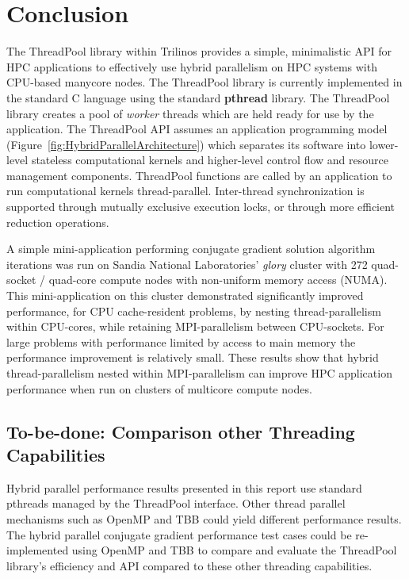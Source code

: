 \section{Conclusion}

The ThreadPool library within Trilinos provides a simple, minimalistic API for HPC applications to effectively use hybrid parallelism on HPC systems with CPU-based manycore nodes.
%
The ThreadPool library is currently implemented in the standard C language using the standard \textbf{pthread} library.
%
The ThreadPool library creates a pool of \emph{worker} threads which are held ready for use by the application.
%
The ThreadPool API assumes an application programming model
(Figure~\ref{fig:HybridParallelArchitecture}) which separates its software into lower-level stateless computational kernels and higher-level control flow and resource management components.
%
ThreadPool functions are called by an application to run computational kernels thread-parallel.
%
Inter-thread synchronization is supported through mutually exclusive execution locks, or through more efficient reduction operations.



A simple mini-application performing conjugate gradient solution algorithm iterations was run on Sandia National Laboratories' \emph{glory} cluster with 272 quad-socket / quad-core compute nodes with non-uniform memory access (NUMA).
%
This mini-application on this cluster demonstrated significantly improved performance, for CPU cache-resident problems, by nesting thread-parallelism within CPU-cores, while retaining MPI-parallelism between CPU-sockets.
%
For large problems with performance limited by access to main memory the performance improvement is relatively small.
%
These results show that hybrid thread-parallelism nested within MPI-parallelism can improve HPC application performance when run on clusters of multicore compute nodes.



\subsection{To-be-done: Comparison other Threading Capabilities}

Hybrid parallel performance results presented in this report use standard pthreads managed by the ThreadPool interface.
%
Other thread parallel mechanisms such as OpenMP and TBB could yield different performance results.
%
The hybrid parallel conjugate gradient performance test cases could be re-implemented using OpenMP and TBB to compare and evaluate the ThreadPool library's efficiency and API compared to these other threading capabilities.



 
